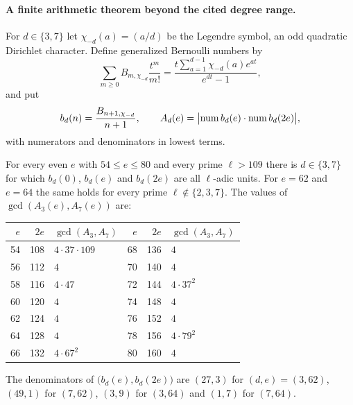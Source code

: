\paragraph{A finite arithmetic theorem beyond the cited degree range.}
For $d\in\{3,7\}$ let $\chi_{-d}(a)=(a/d)$ be the Legendre symbol, an odd
quadratic Dirichlet character. Define generalized Bernoulli numbers by
\[
 \sum_{m\ge0}B_{m,\chi_{-d}}\frac{t^m}{m!}
 =\frac{t\sum_{a=1}^{d-1}\chi_{-d}(a)e^{at}}{e^{dt}-1},
\]
and put
\[
 b_d(n)=\frac{B_{n+1,\chi_{-d}}}{n+1},\qquad
 A_d(e)=\abs[\big]{\selnum b_d(e)\cdot\selnum b_d(2e)},
\]
with numerators and denominators in lowest terms.

\begin{theorem}\label{sel:thm:screening}
For every even $e$ with $54\le e\le80$ and every prime $\ell>109$ there is
$d\in\{3,7\}$ for which $b_d(0)$, $b_d(e)$ and $b_d(2e)$ are all
$\ell$-adic units. For $e=62$ and $e=64$ the same holds for every prime
$\ell\notin\{2,3,7\}$. The values of $\gcd(A_3(e),A_7(e))$ are:
\begin{center}
\begin{tabular}{@{}rrl@{\qquad}rrl@{}}
\toprule
$e$ & $2e$ & $\gcd(A_3,A_7)$ & $e$ & $2e$ & $\gcd(A_3,A_7)$\\
\midrule
54&108&$4\cdot37\cdot109$&68&136&$4$\\
56&112&$4$&70&140&$4$\\
58&116&$4\cdot47$&72&144&$4\cdot37^2$\\
60&120&$4$&74&148&$4$\\
62&124&$4$&76&152&$4$\\
64&128&$4$&78&156&$4\cdot79^2$\\
66&132&$4\cdot67^2$&80&160&$4$\\
\bottomrule
\end{tabular}
\end{center}
The denominators of $\bigl(b_d(e),b_d(2e)\bigr)$ are $(27,3)$ for
$(d,e)=(3,62)$, $(49,1)$ for $(7,62)$, $(3,9)$ for $(3,64)$ and $(1,7)$ for
$(7,64)$.
\end{theorem}


